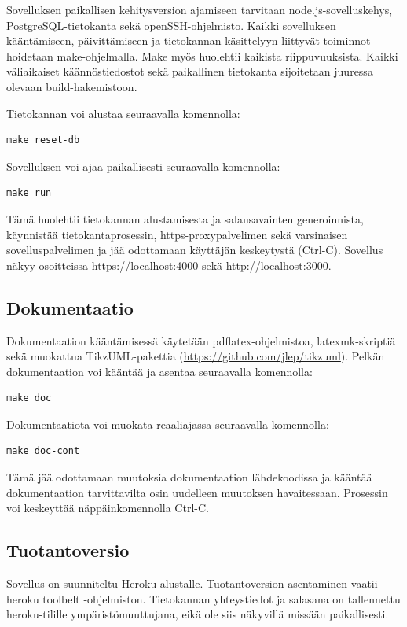 \documentclass[a4paper,parskip=half]{scrartcl}
\begin{document}
Sovelluksen paikallisen kehitysversion ajamiseen tarvitaan
node.js-sovelluskehys, PostgreSQL-tietokanta sekä openSSH-ohjelmisto. Kaikki
sovelluksen kääntämiseen, päivittämiseen ja tietokannan käsittelyyn
liittyvät toiminnot hoidetaan make-ohjelmalla. Make myös huolehtii kaikista
riippuvuuksista. Kaikki väliaikaiset käännöstiedostot sekä
paikallinen tietokanta sijoitetaan juuressa olevaan build-hakemistoon.

Tietokannan voi alustaa seuraavalla komennolla:
\begin{Verbatim}
make reset-db
\end{Verbatim}

Sovelluksen voi ajaa paikallisesti seuraavalla komennolla:
\begin{Verbatim}
make run
\end{Verbatim}
Tämä huolehtii tietokannan alustamisesta ja salausavainten generoinnista,
käynnistää tietokantaprosessin, https-proxypalvelimen sekä varsinaisen
sovelluspalvelimen ja jää odottamaan käyttäjän keskeytystä (Ctrl-C).
Sovellus näkyy osoitteissa \url{https://localhost:4000} sekä
\url{http://localhost:3000}.

\subsection{Dokumentaatio}
Dokumentaation kääntämisessä käytetään pdflatex-ohjelmistoa, latexmk-skriptiä
sekä muokattua TikzUML-pakettia (\url{https://github.com/jlep/tikzuml}).
Pelkän dokumentaation voi kääntää ja asentaa seuraavalla komennolla:
\begin{Verbatim}
make doc
\end{Verbatim}

Dokumentaatiota voi muokata reaaliajassa seuraavalla komennolla:
\begin{Verbatim}
make doc-cont
\end{Verbatim}
Tämä jää odottamaan muutoksia dokumentaation lähdekoodissa ja kääntää
dokumentaation tarvittavilta osin uudelleen muutoksen havaitessaan. Prosessin
voi keskeyttää näppäinkomennolla Ctrl-C.

\subsection{Tuotantoversio}

Sovellus on suunniteltu Heroku-alustalle. Tuotantoversion asentaminen
vaatii heroku toolbelt -ohjelmiston. Tietokannan yhteystiedot ja salasana
on tallennettu heroku-tilille ympäristömuuttujana, eikä ole siis näkyvillä
missään paikallisesti.
\end{document}
